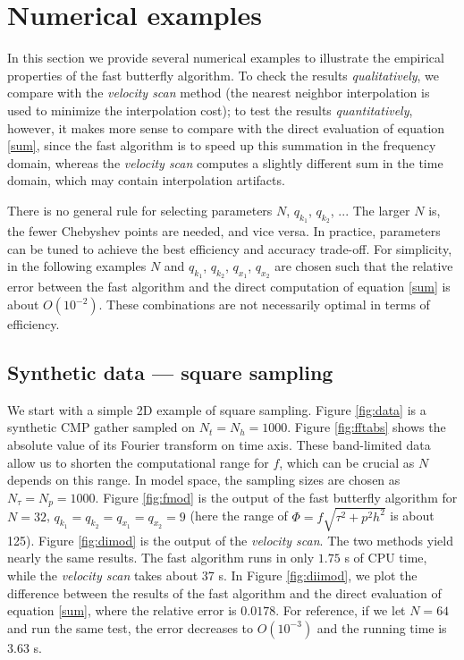 

\section{Numerical examples}

In this section we provide several numerical examples to illustrate the empirical properties of the fast butterfly algorithm. To check the results {\it qualitatively}, we compare with the {\it velocity scan} method (the nearest neighbor interpolation is used to minimize the interpolation cost); to test the results {\it quantitatively}, however, it makes more sense to compare with the direct evaluation of equation \ref{sum}, since the fast algorithm is to speed up this summation in the frequency domain, whereas the {\it velocity scan} computes a slightly different sum in the time domain, which may contain interpolation artifacts.

There is no general rule for selecting parameters $N$, $q_{k_1}$, $q_{k_2}$, ... The larger $N$ is, the fewer Chebyshev points are needed, and vice versa. In practice, parameters can be tuned to achieve the best efficiency and accuracy trade-off. For simplicity, in the following examples $N$ and $q_{k_1}$, $q_{k_2}$, $q_{x_1}$, $q_{x_2}$ are chosen such that the relative error between the fast algorithm and the direct computation of equation \ref{sum} is about $O(10^{-2})$. These combinations are not necessarily optimal in terms of efficiency.



\subsection{Synthetic data --- square sampling}

We start with a simple 2D example of square sampling. Figure \ref{fig:data} is a synthetic CMP gather sampled on $N_t=N_h=1000$. Figure \ref{fig:fftabs} shows the absolute value of its Fourier transform on time axis. These band-limited data allow us to shorten the computational range for $f$, which can be crucial as $N$ depends on this range. In model space, the sampling sizes are chosen as $N_{\tau}=N_p=1000$. Figure \ref{fig:fmod} is the output of the fast butterfly algorithm for $N=32$, $q_{k_1}=q_{k_2}=q_{x_1}=q_{x_2}=9$ (here the range of $\Phi=f\sqrt{\tau^2+p^2h^2}$ is about 125). Figure \ref{fig:dimod} is the output of the {\it velocity scan}. The two methods yield nearly the same results. The fast algorithm runs in only $1.75$ s of CPU time, while the {\it velocity scan} takes about 37 s. In Figure \ref{fig:diimod}, we plot the difference between the results of the fast algorithm and the direct evaluation of equation \ref{sum}, where the relative error is $0.0178$. For reference, if we let $N=64$ and run the same test, the error decreases to $O(10^{-3})$ and the running time is 3.63 s.

